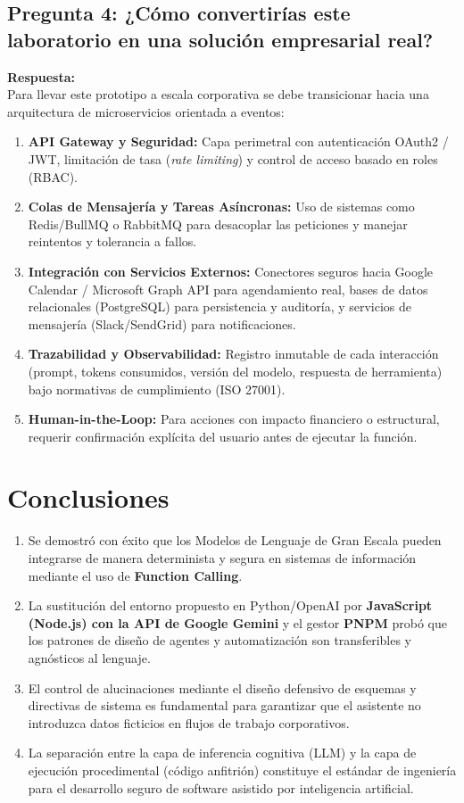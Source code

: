 \documentclass[11pt,a4paper]{article}
\begin{document}
\subsection{Pregunta 4: ¿Cómo convertirías este laboratorio en una solución empresarial real?}
\noindent\textbf{Respuesta:}\\
Para llevar este prototipo a escala corporativa se debe transicionar hacia una arquitectura de microservicios orientada a eventos:
\begin{enumerate}
    \item \textbf{API Gateway y Seguridad:} Capa perimetral con autenticación OAuth2 / JWT, limitación de tasa (\textit{rate limiting}) y control de acceso basado en roles (RBAC).
    \item \textbf{Colas de Mensajería y Tareas Asíncronas:} Uso de sistemas como Redis/BullMQ o RabbitMQ para desacoplar las peticiones y manejar reintentos y tolerancia a fallos.
    \item \textbf{Integración con Servicios Externos:} Conectores seguros hacia Google Calendar / Microsoft Graph API para agendamiento real, bases de datos relacionales (PostgreSQL) para persistencia y auditoría, y servicios de mensajería (Slack/SendGrid) para notificaciones.
    \item \textbf{Trazabilidad y Observabilidad:} Registro inmutable de cada interacción (prompt, tokens consumidos, versión del modelo, respuesta de herramienta) bajo normativas de cumplimiento (ISO 27001).
    \item \textbf{Human-in-the-Loop:} Para acciones con impacto financiero o estructural, requerir confirmación explícita del usuario antes de ejecutar la función.
\end{enumerate}

\section{Conclusiones}

\begin{enumerate}
    \item Se demostró con éxito que los Modelos de Lenguaje de Gran Escala pueden integrarse de manera determinista y segura en sistemas de información mediante el uso de \textbf{Function Calling}.
    \item La sustitución del entorno propuesto en Python/OpenAI por \textbf{JavaScript (Node.js) con la API de Google Gemini} y el gestor \textbf{PNPM} probó que los patrones de diseño de agentes y automatización son transferibles y agnósticos al lenguaje.
    \item El control de alucinaciones mediante el diseño defensivo de esquemas y directivas de sistema es fundamental para garantizar que el asistente no introduzca datos ficticios en flujos de trabajo corporativos.
    \item La separación entre la capa de inferencia cognitiva (LLM) y la capa de ejecución procedimental (código anfitrión) constituye el estándar de ingeniería para el desarrollo seguro de software asistido por inteligencia artificial.
\end{enumerate}
\end{document}

